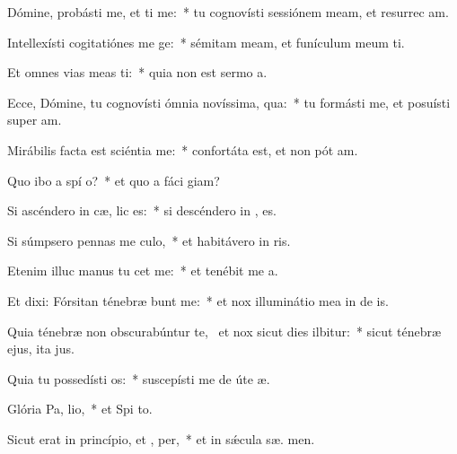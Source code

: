 \item Dómine, probásti me, et ti me:~* tu cognovísti sessiónem meam, et resurrec am.
\item Intellexísti cogitatiónes me  ge:~* sémitam meam, et funículum meum ti.
\item Et omnes vias meas ti:~* quia non est sermo   a.
\item Ecce, Dómine, tu cognovísti ómnia novíssima,  qua:~* tu formásti me, et posuísti super   am.
\item Mirábilis facta est sciéntia   me:~* confortáta est, et non pót  am.
\item Quo ibo a spí o?~* et quo a fáci  giam?
\item Si ascéndero in cæ,  lic es:~* si descéndero in , es.
\item Si súmpsero pennas me culo,~* et habitávero in  ris.
\item Etenim illuc manus tu cet me:~* et tenébit me  a.
\item Et dixi: Fórsitan ténebræ bunt me:~* et nox illuminátio mea in de is.
\item Quia ténebræ non obscurabúntur  te,~\pscross{} et nox sicut dies ilbitur:~* sicut ténebræ ejus, ita   jus.
\item Quia tu possedísti  os:~* suscepísti me de úte  æ.
\item Glória Pa,  lio,~* et Spi to.
\item Sicut erat in princípio, et ,  per,~* et in sǽcula sæ. men.

